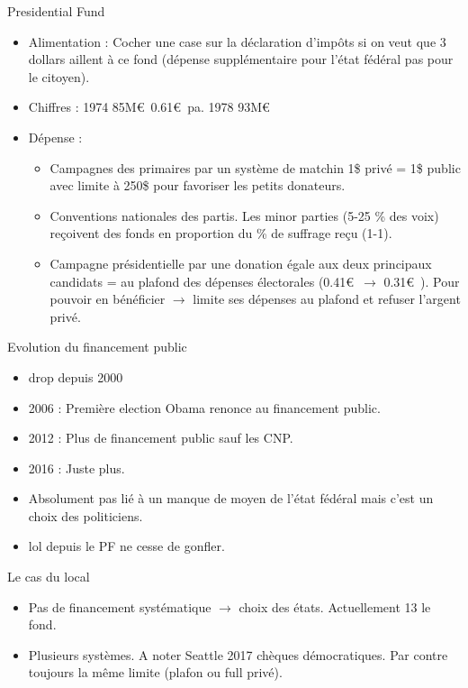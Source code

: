 \documentclass[10pt,t]{beamer}
\begin{document}
\begin{frame}{Presidential Fund}
    \begin{itemize}
        \item \alert{Alimentation} : Cocher une case sur la déclaration d'impôts si on veut que 3 dollars aillent à ce fond (dépense supplémentaire pour l'état fédéral pas pour le citoyen).
        \item \alert{Chiffres} : 1974 85M\euro\ 0.61\euro\ pa. 1978 93M\euro\
        \item \alert{Dépense} : 
            \begin{itemize}
                \item Campagnes des primaires par un système de matchin 1\$ privé = 1\$ public avec limite à 250\$ pour favoriser les petits donateurs.
                \item Conventions nationales des partis. Les minor parties (5-25 \% des voix) reçoivent des fonds en proportion du \% de suffrage reçu (1-1).
                \item Campagne présidentielle par une donation égale aux deux principaux candidats = au plafond des dépenses électorales (0.41\euro\ $\rightarrow$ 0.31\euro\ ). Pour pouvoir en bénéficier $\rightarrow$ limite ses dépenses au plafond et refuser l'argent privé. 
            \end{itemize} 
    \end{itemize}
\end{frame}

\begin{frame}{Evolution du financement public}
    \begin{itemize}
        \item drop depuis 2000
        \item \alert{2006} : Première election Obama renonce au financement public.
        \item \alert{2012} : Plus de financement public sauf les CNP.
        \item \alert{2016} : Juste plus.
        \item Absolument pas lié à un manque de moyen de l'état fédéral mais c'est un choix des politiciens.
        \item lol depuis le PF ne cesse de gonfler.
    \end{itemize}
\end{frame}

\begin{frame}{Le cas du local}
    \begin{itemize}
        \item \alert{Pas de financement systématique} $\rightarrow$ choix des états. Actuellement 13 le fond.
        \item \alert{Plusieurs systèmes}. A noter Seattle 2017 chèques démocratiques. Par contre toujours la même limite (plafon ou full privé).
    \end{itemize}
\end{frame}
\end{document}
